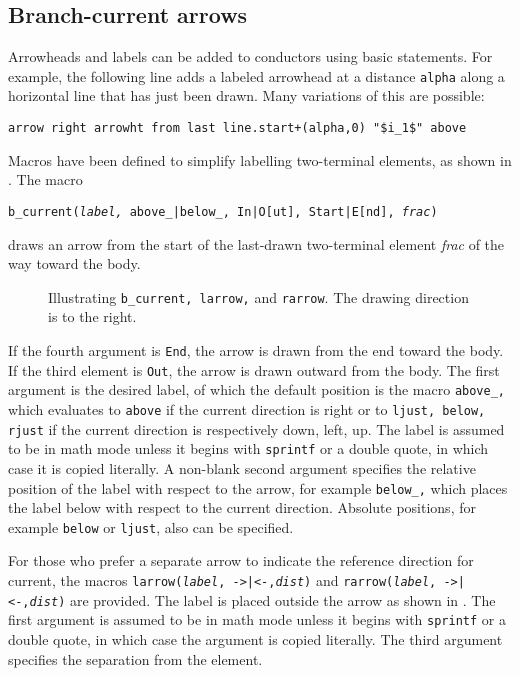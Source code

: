 \subsection{Branch-current arrows\label{Branchcurrent:}}
Arrowheads and labels can be added to conductors using basic
\pic statements.  For example, the following line adds a labeled
arrowhead at a distance {\tt alpha} along a horizontal line that has
just been drawn.  Many variations of this are possible:

  \verb|arrow right arrowht from last line.start+(alpha,0) "$i_1$" above|

Macros have been defined to simplify labelling two-terminal
elements, as shown in .
The macro

   {\tt b\_current({\sl label,} above\_|below\_, In|O[ut], Start|E[nd],
   {\sl frac})}

\noindent
draws an arrow from the start of the last-drawn two-terminal element
{\sl frac} of the way toward the body.
\begin{figure}[h!t]
   
   \caption{Illustrating {\tt b\_current, larrow,} and {\tt rarrow}.
      The drawing direction is to the right.}
   \label{currents}
   \end{figure}

If the fourth argument is {\tt End}, the arrow is drawn from the end
toward the body.
If the third element is {\tt Out}, the arrow is drawn outward from the body.
The first argument is the desired label, of which the default position is
the macro {\tt above\_,} which evaluates to {\tt above} if the current
direction is right or to {\tt ljust, below, rjust} if the current
direction is respectively down, left, up.  The label is assumed to be
in math mode unless it begins with {\tt sprintf} or a double quote, in which
case it is copied literally.  A non-blank second argument specifies the
relative position of the label with respect to the arrow, for example
{\tt below\_,} which places the label below with respect to the current
direction.  Absolute positions, for example {\tt below} or {\tt ljust},
also can be specified.

For those who prefer a separate arrow to indicate the reference
direction for current, the macros {\tt larrow({\sl label}, ->|<-,{\sl dist})}
and {\tt rarrow({\sl label}, ->|<-,{\sl dist})} are provided.  The label is
placed outside the arrow as shown in .  The first
argument is assumed to be in math mode unless
it begins with {\tt sprintf} or a double
quote, in which case the argument is copied literally.  The third argument
specifies the separation from the element.

